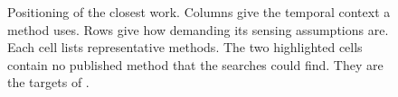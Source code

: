 \begin{figure}[htbp]

\vspace{2mm}
\caption[Positioning of the closest work by temporal context and sensing]{Positioning
of the closest work. Columns give the temporal context a method uses.
Rows give how demanding its sensing assumptions are. Each cell lists
representative methods. The two highlighted cells contain no published
method that the searches could find. They are the targets of \methodS{}.}
\label{fig:positioning}
\end{figure}
